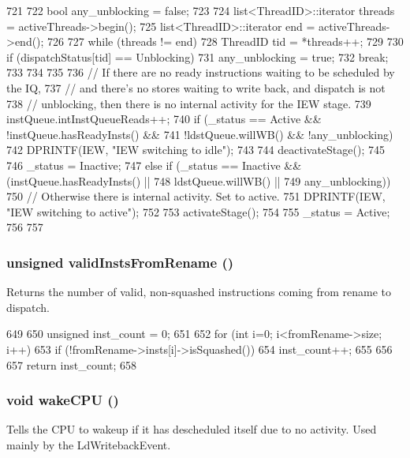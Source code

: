 \begin{DoxyCode}
721 {
722     bool any_unblocking = false;
723 
724     list<ThreadID>::iterator threads = activeThreads->begin();
725     list<ThreadID>::iterator end = activeThreads->end();
726 
727     while (threads != end) {
728         ThreadID tid = *threads++;
729 
730         if (dispatchStatus[tid] == Unblocking) {
731             any_unblocking = true;
732             break;
733         }
734     }
735 
736     // If there are no ready instructions waiting to be scheduled by the IQ,
737     // and there's no stores waiting to write back, and dispatch is not
738     // unblocking, then there is no internal activity for the IEW stage.
739     instQueue.intInstQueueReads++;
740     if (_status == Active && !instQueue.hasReadyInsts() &&
741         !ldstQueue.willWB() && !any_unblocking) {
742         DPRINTF(IEW, "IEW switching to idle\n");
743 
744         deactivateStage();
745 
746         _status = Inactive;
747     } else if (_status == Inactive && (instQueue.hasReadyInsts() ||
748                                        ldstQueue.willWB() ||
749                                        any_unblocking)) {
750         // Otherwise there is internal activity.  Set to active.
751         DPRINTF(IEW, "IEW switching to active\n");
752 
753         activateStage();
754 
755         _status = Active;
756     }
757 }
\end{DoxyCode}
\hypertarget{classDefaultIEW_a5fc3225c48aefdbd7d923903a3aa5bc6}{
\subsubsection[{validInstsFromRename}]{\setlength{\rightskip}{0pt plus 5cm}unsigned validInstsFromRename ()}}
\label{classDefaultIEW_a5fc3225c48aefdbd7d923903a3aa5bc6}
Returns the number of valid, non-\/squashed instructions coming from rename to dispatch. 


\begin{DoxyCode}
649 {
650     unsigned inst_count = 0;
651 
652     for (int i=0; i<fromRename->size; i++) {
653         if (!fromRename->insts[i]->isSquashed())
654             inst_count++;
655     }
656 
657     return inst_count;
658 }
\end{DoxyCode}
\hypertarget{classDefaultIEW_abce3a63b123f84972e4df7962f9b870e}{
\subsubsection[{wakeCPU}]{\setlength{\rightskip}{0pt plus 5cm}void wakeCPU ()}}
\label{classDefaultIEW_abce3a63b123f84972e4df7962f9b870e}
Tells the CPU to wakeup if it has descheduled itself due to no activity. Used mainly by the LdWritebackEvent. 


